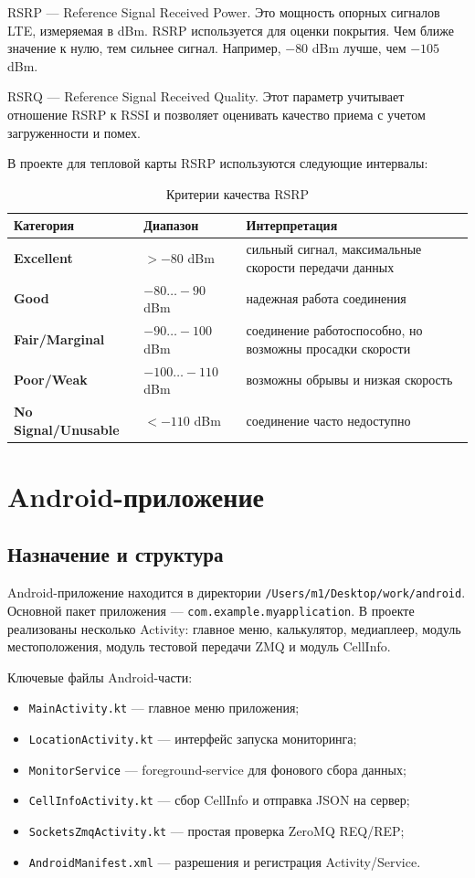 \documentclass[14pt,a4paper]{extarticle}
\begin{document}
RSRP --- Reference Signal Received Power. Это мощность опорных сигналов LTE, измеряемая в dBm. RSRP используется для оценки покрытия. Чем ближе значение к нулю, тем сильнее сигнал. Например, $-80$ dBm лучше, чем $-105$ dBm.

RSRQ --- Reference Signal Received Quality. Этот параметр учитывает отношение RSRP к RSSI и позволяет оценивать качество приема с учетом загруженности и помех.

В проекте для тепловой карты RSRP используются следующие интервалы:

\begin{table}[H]
\centering
\caption{Критерии качества RSRP}
\begin{tabularx}{\textwidth}{>{\bfseries}l l X}
\toprule
Категория & Диапазон & Интерпретация \\
\midrule
Excellent & $>-80$ dBm & сильный сигнал, максимальные скорости передачи данных \\
Good & $-80 \ldots -90$ dBm & надежная работа соединения \\
Fair/Marginal & $-90 \ldots -100$ dBm & соединение работоспособно, но возможны просадки скорости \\
Poor/Weak & $-100 \ldots -110$ dBm & возможны обрывы и низкая скорость \\
No Signal/Unusable & $<-110$ dBm & соединение часто недоступно \\
\bottomrule
\end{tabularx}
\end{table}

\section{Android-приложение}

\subsection{Назначение и структура}

Android-приложение находится в директории \texttt{/Users/m1/Desktop/work/android}. Основной пакет приложения --- \texttt{com.example.myapplication}. В проекте реализованы несколько Activity: главное меню, калькулятор, медиаплеер, модуль местоположения, модуль тестовой передачи ZMQ и модуль CellInfo.

Ключевые файлы Android-части:
\begin{itemize}
    \item \texttt{MainActivity.kt} --- главное меню приложения;
    \item \texttt{LocationActivity.kt} --- интерфейс запуска мониторинга;
    \item \texttt{MonitorService} --- foreground-service для фонового сбора данных;
    \item \texttt{CellInfoActivity.kt} --- сбор CellInfo и отправка JSON на сервер;
    \item \texttt{SocketsZmqActivity.kt} --- простая проверка ZeroMQ REQ/REP;
    \item \texttt{AndroidManifest.xml} --- разрешения и регистрация Activity/Service.
\end{itemize}
\end{document}

